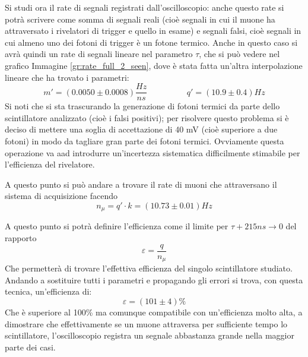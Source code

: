 Si studi ora il rate di segnali registrati dall'oscilloscopio: anche questo rate si potrà scrivere come somma di segnali reali (cioè segnali in cui il muone ha attraversato i rivelatori di trigger e quello in esame) e segnali falsi, cioè segnali in cui almeno uno dei fotoni di trigger è un fotone termico. Anche in questo caso si avrà quindi un rate di segnali lineare nel parametro $\tau$, che si può vedere nel grafico Immagine \ref{gr:rate_full_2_seen}, dove è stata fatta un'altra interpolazione lineare che ha trovato i parametri:
\begin{equation}
  m' = (0.0050 \pm 0.0008) \frac{Hz}{ns} \hspace{2cm} q' = (10.9 \pm 0.4) Hz
\end{equation}
Si noti che si sta trascurando la generazione di fotoni termici da parte dello scintillatore analizzato (cioè i falsi positivi); per risolvere questo problema si è deciso di mettere una soglia di accettazione di 40 mV (cioè superiore a due fotoni) in modo da tagliare gran parte dei fotoni termici. Ovviamente questa operazione va aad introdurre un'incertezza sistematica difficilmente stimabile per l'efficienza del rivelatore.\\

A questo punto si può andare a trovare il rate di muoni che attraversano il sistema di acquisizione facendo
\begin{equation}
  n_\mu = q' \cdot k = (10.73 \pm 0.01) Hz
\end{equation}

A questo punto si potrà definire l'efficienza come il limite per $\tau + 215 ns \to 0$ del rapporto
$$\varepsilon = \frac{q}{n_\mu}$$
Che permetterà di trovare l'effettiva efficienza del singolo scintillatore studiato. Andando a sostituire tutti i parametri e propagando gli errori si trova, con questa tecnica, un'efficienza di:
\begin{equation}
  \varepsilon = (101 \pm 4)\%
\end{equation}
Che è superiore al 100\% ma comunque compatibile con un'efficienza molto alta, a dimostrare che effettivamente se un muone attraversa per sufficiente tempo lo scintillatore, l'oscilloscopio registra un segnale abbastanza grande nella maggior parte dei casi.\\

